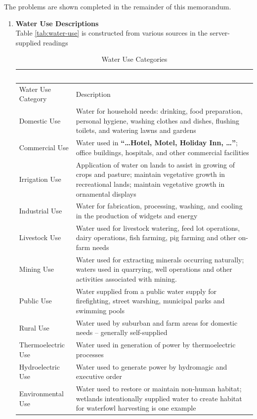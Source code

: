 \documentclass[12pt]{article}
\begin{document}
The problems are shown completed in the remainder of this memorandum.  
\newpage
\begin{enumerate}
\item{{\textbf{Water Use Descriptions}}}~\\
Table \ref{tab:water-use} is constructed from various sources in the server-supplied readings
\begin{table}[h!]
   \centering
   \caption{Water Use Categories}
   \begin{tabular}{p{1.7in}p{4.3in}} %
   ~ & ~ \\
\hline \hline
Water Use Category & Description \\
\hline
Domestic Use & Water for household needs: drinking, food preparation, personal hygiene, washing clothes and dishes, flushing toilets, and watering lawns and gardens \\
Commercial Use & Water used in \textbf{``\dots Hotel, Motel, Holiday Inn, \dots''}; office buildings, hospitals, and other commercial facilities \\
Irrigation Use & Application of water on lands to assist in growing of crops and pasture; maintain vegetative growth in recreational lands; maintain vegetative growth in ornamental displays\\
Industrial Use & Water for fabrication, processing, washing, and cooling in the production of widgets and energy\\
Livestock Use & Water used for livestock watering, feed lot operations, dairy operations, fish farming, pig farming and other on-farm needs\\
Mining Use & Water used for extracting minerals occurring naturally; waters used in quarrying, well operations and other activities associated with mining.\\
Public Use & Water supplied from a public water supply for firefighting, street warshing, municipal parks and swimming pools\\
Rural Use & Water used by suburban and farm areas for domestic needs -- generally self-supplied\\
Thermoelectric Use & Water used in generation of power by thermoelectric processes \\
Hydroelectric Use & Water used to generate power by hydromagic and executive order \\ %
Environmental Use & Water used to restore or maintain non-human habitat; wetlands intentionally supplied water to create habitat for waterfowl harvesting is one example\\


\end{tabular}
\end{table}
\end{enumerate}
\end{document}
